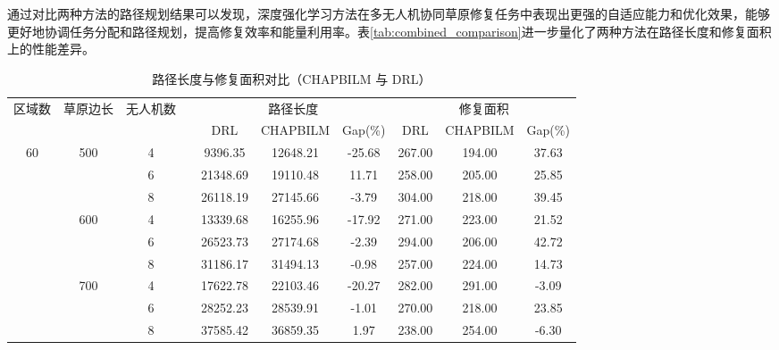 \documentclass[AutoFakeBold]{LZUThesis}
\begin{document}
通过对比两种方法的路径规划结果可以发现，深度强化学习方法在多无人机协同草原修复任务中表现出更强的自适应能力和优化效果，能够更好地协调任务分配和路径规划，提高修复效率和能量利用率。表\ref{tab:combined_comparison}进一步量化了两种方法在路径长度和修复面积上的性能差异。
\begin{table}[H]
	\centering
	\caption{路径长度与修复面积对比（CHAPBILM 与 DRL）}
	\small
	\setlength{\tabcolsep}{3.5pt}
	\begin{tabular}{cccc ccc ccc}
		\toprule
		区域数                 & 草原边长                 & 无人机数 &  & \multicolumn{3}{c}{路径长度} & \multicolumn{3}{c}{修复面积}                                       \\
		\cmidrule(lr){5-7} \cmidrule(lr){8-10}
							&                      &      &  & DRL                      & CHAPBILM                       & Gap(\%) & DRL    & CHAPBILM     & Gap(\%) \\
		\midrule
		\multirow{9}{*}{60} & \multirow{3}{*}{500} & 4    &  & 9396.35                  & 12648.21                 & -25.68  & 267.00 & 194.00 & 37.63   \\
							&                      & 6    &  & 21348.69                 & 19110.48                 & 11.71   & 258.00 & 205.00 & 25.85   \\
							&                      & 8    &  & 26118.19                 & 27145.66                 & -3.79   & 304.00 & 218.00 & 39.45   \\
		\cmidrule(lr){2-10}
							& \multirow{3}{*}{600} & 4    &  & 13339.68                 & 16255.96                 & -17.92  & 271.00 & 223.00 & 21.52   \\
							&                      & 6    &  & 26523.73                 & 27174.68                 & -2.39   & 294.00 & 206.00 & 42.72   \\
							&                      & 8    &  & 31186.17                 & 31494.13                 & -0.98   & 257.00 & 224.00 & 14.73   \\
		\cmidrule(lr){2-10}
							& \multirow{3}{*}{700} & 4    &  & 17622.78                 & 22103.46                 & -20.27  & 282.00 & 291.00 & -3.09   \\
							&                      & 6    &  & 28252.23                 & 28539.91                 & -1.01   & 270.00 & 218.00 & 23.85   \\
							&                      & 8    &  & 37585.42                 & 36859.35                 & 1.97    & 238.00 & 254.00 & -6.30   \\
		\midrule

\end{tabular}
\end{table}
\end{document}
